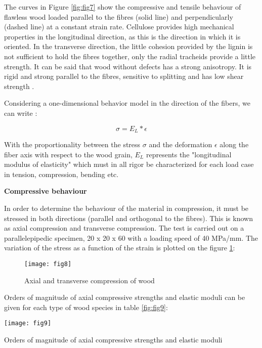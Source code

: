 The curves in Figure \ref{fig:fig7} show the compressive and tensile behaviour of flawless wood loaded parallel to the fibres (solid line) and perpendicularly (dashed line) at a constant strain rate. Cellulose provides high mechanical properties in the longitudinal direction, as this is the direction in which it is oriented. In the transverse direction, the little cohesion provided by the lignin is not sufficient to hold the fibres together, only the radial tracheids provide a little strength. It can be said that wood without defects has a strong anisotropy. It is rigid and strong parallel to the fibres, sensitive to splitting and has low shear strength \cite{Reference6}.

Considering a one-dimensional behavior model in the direction of the fibers, we can write :

\begin{equation}
	\sigma = E_{L}*\epsilon
\end{equation}

With the proportionality between the stress $\sigma$ and the deformation $\epsilon$ along the fiber axis with respect to the wood grain, $ E_L $ represents the "longitudinal modulus of elasticity" which must in all rigor be characterized for each load case in tension, compression, bending etc.


\textbf{Compressive behaviour}

In order to determine the behaviour of the material in compression, it must be stressed in both directions (parallel and orthogonal to the fibres). This is known as axial compression and transverse compression. The test is carried out on a parallelepipedic specimen, 20 x 20 x 60  with a loading speed of 40 MPa/mm. The variation of the stress as a function of the strain is plotted on the figure \ref{fig:fig8}:

\graphicspath{{Images/}}
\begin{figure}[htp]
	\centering
	\texttt{[image: fig8]}
	\caption{Axial and transverse compression of wood}
	\label{fig:fig8}
\end{figure}

Orders of magnitude of axial compressive strengths and elastic moduli can be given for each type of wood species in table \ref{fig:fig9}: 

\graphicspath{{Images/}}
\begin{table}[htp]
	\centering
	\texttt{[image: fig9]}
	\caption{Orders of magnitude of axial compressive strengths and elastic moduli}
	\label{fig:fig9}
\end{table}

